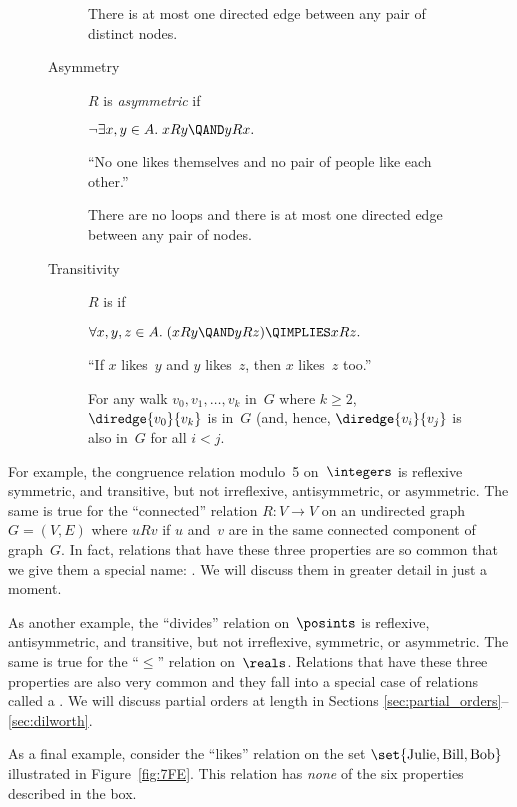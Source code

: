 \begin{figure}[p]
\begin{pagesidebar}[to \textheight]
\begin{description}
There is at most one directed edge between any pair of distinct nodes.

\item[Asymmetry]

$R$ is \emph{asymmetric} if

$ \neg \exists x, y \in A. \; x R y \QAND y R x. $

``No one likes themselves and no pair of people like each other.''

There are no loops and there is at most one directed edge between any
pair of nodes.

\item[Transitivity]

$R$ is  if

$ \forall x, y, z \in A. \; (x R y \QAND y R z) \QIMPLIES x R z.$

``If $x$ likes~$y$ and $y$ likes~$z$, then $x$ likes~$z$ too.''

For any walk $v_0, v_1, \dots, v_k$ in~$G$ where $k \ge 2$,
\ $\diredge{v_0}{v_k}$ is in~$G$ (and, hence, $\diredge{v_i}{v_j}$ is
also in~$G$ for all $i < j$.

\end{description}
\end{pagesidebar}

\end{figure}

For example, the congruence relation modulo~5 on~$\integers$ is
reflexive symmetric, and transitive, but not irreflexive,
antisymmetric, or asymmetric.  The same is true for the ``connected''
relation $R: V \to V$ on an undirected graph $G = (V, E)$ where $u R
v$ if $u$ and~$v$ are in the same connected component of graph~$G$.
In fact, relations that have these three properties are so common that
we give them a special name: .  We will
discuss them in greater detail in just a moment.

As another example, the ``divides'' relation on~$\posints$ is
reflexive, antisymmetric, and transitive, but not irreflexive,
symmetric, or asymmetric.  The same is true for the ``$\le$'' relation
on~$\reals$.  Relations that have these three properties are also very
common and they fall into a special case of relations called a
.  We will discuss partial orders at length in
Sections \ref{sec:partial_orders}--\ref{sec:dilworth}.

As a final example, consider the ``likes'' relation on the set $\set{
  \text{Julie}, \text{Bill}, \text{Bob} }$ illustrated in
Figure~\ref{fig:7FE}.  This relation has \emph{none} of the six
properties described in the box.

